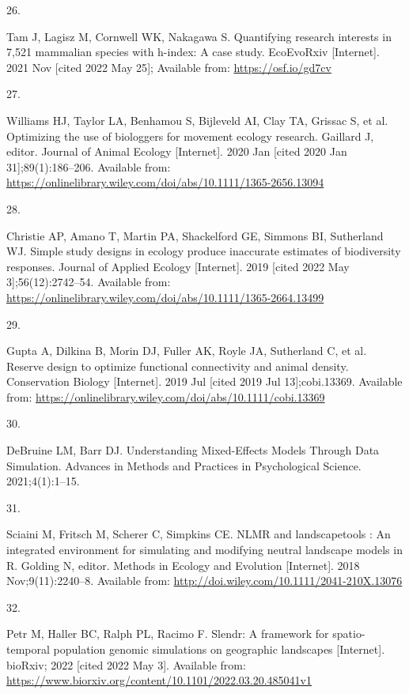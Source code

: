 \documentclass[10pt,a4paper]{article}
\newlength{\cslhangindent}
\newlength{\csllabelwidth}
\newenvironment{CSLReferences}[2] %
{\begin{list}{}{%
	\setlength{\itemindent}{0pt}
	\setlength{\leftmargin}{0pt}
	\setlength{\parsep}{0pt}
	\ifodd #1
	\setlength{\leftmargin}{\cslhangindent}
	\setlength{\itemindent}{-1\cslhangindent}
	\fi
	\setlength{\itemsep}{#2\baselineskip}}}
{\end{list}}
\newcommand{\CSLLeftMargin}[1]{\parbox[t]{\csllabelwidth}{\strut#1\strut}}
\newcommand{\CSLRightInline}[1]{\parbox[t]{\linewidth - \csllabelwidth}{\strut#1\strut}}
\begin{document}
\begin{CSLReferences}{0}{1}
\CSLLeftMargin{26. }%
\CSLRightInline{Tam J, Lagisz M, Cornwell WK, Nakagawa S. Quantifying research interests in 7,521 mammalian species with h-index: A case study. EcoEvoRxiv {[}Internet{]}. 2021 Nov {[}cited 2022 May 25{]}; Available from: \url{https://osf.io/gd7cv}}

\CSLLeftMargin{27. }%
\CSLRightInline{Williams HJ, Taylor LA, Benhamou S, Bijleveld AI, Clay TA, Grissac S, et al. Optimizing the use of biologgers for movement ecology research. Gaillard J, editor. Journal of Animal Ecology {[}Internet{]}. 2020 Jan {[}cited 2020 Jan 31{]};89(1):186--206. Available from: \url{https://onlinelibrary.wiley.com/doi/abs/10.1111/1365-2656.13094}}

\CSLLeftMargin{28. }%
\CSLRightInline{Christie AP, Amano T, Martin PA, Shackelford GE, Simmons BI, Sutherland WJ. Simple study designs in ecology produce inaccurate estimates of biodiversity responses. Journal of Applied Ecology {[}Internet{]}. 2019 {[}cited 2022 May 3{]};56(12):2742--54. Available from: \url{https://onlinelibrary.wiley.com/doi/abs/10.1111/1365-2664.13499}}

\CSLLeftMargin{29. }%
\CSLRightInline{Gupta A, Dilkina B, Morin DJ, Fuller AK, Royle JA, Sutherland C, et al. Reserve design to optimize functional connectivity and animal density. Conservation Biology {[}Internet{]}. 2019 Jul {[}cited 2019 Jul 13{]};cobi.13369. Available from: \url{https://onlinelibrary.wiley.com/doi/abs/10.1111/cobi.13369}}

\CSLLeftMargin{30. }%
\CSLRightInline{DeBruine LM, Barr DJ. Understanding {Mixed}-{Effects} {Models} {Through} {Data} {Simulation}. Advances in Methods and Practices in Psychological Science. 2021;4(1):1--15. }

\CSLLeftMargin{31. }%
\CSLRightInline{Sciaini M, Fritsch M, Scherer C, Simpkins CE. {NLMR} and landscapetools : {An} integrated environment for simulating and modifying neutral landscape models in {R}. Golding N, editor. Methods in Ecology and Evolution {[}Internet{]}. 2018 Nov;9(11):2240--8. Available from: \url{http://doi.wiley.com/10.1111/2041-210X.13076}}

\CSLLeftMargin{32. }%
\CSLRightInline{Petr M, Haller BC, Ralph PL, Racimo F. Slendr: A framework for spatio-temporal population genomic simulations on geographic landscapes {[}Internet{]}. bioRxiv; 2022 {[}cited 2022 May 3{]}. Available from: \url{https://www.biorxiv.org/content/10.1101/2022.03.20.485041v1}}


\end{CSLReferences}
\end{document}
